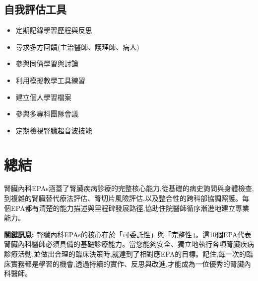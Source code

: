 \documentclass[12pt,a4paper]{article}
\begin{document}
\subsection{自我評估工具}
\begin{itemize}[nosep]
    \item 定期記錄學習歷程與反思
    \item 尋求多方回饋(主治醫師、護理師、病人)
    \item 參與同儕學習與討論
    \item 利用模擬教學工具練習
    \item 建立個人學習檔案
    \item 參與多專科團隊會議
    \item 定期檢視腎臟超音波技能
\end{itemize}

\section{總結}

腎臟內科EPAs涵蓋了腎臟疾病診療的完整核心能力,從基礎的病史詢問與身體檢查,到複雜的腎臟替代療法評估、腎切片風險評估,以及整合性的跨科部協調照護。每個EPA都有清楚的能力描述與里程碑發展路徑,協助住院醫師循序漸進地建立專業能力。

\begin{importantbox}
\textbf{關鍵訊息:} 腎臟內科EPAs的核心在於「可委託性」與「完整性」。這10個EPA代表腎臟內科醫師必須具備的基礎診療能力。當您能夠安全、獨立地執行各項腎臟疾病診療活動,並做出合理的臨床決策時,就達到了相對應EPA的目標。記住,每一次的臨床實務都是學習的機會,透過持續的實作、反思與改進,才能成為一位優秀的腎臟內科醫師。
\end{importantbox}

\end{document}
